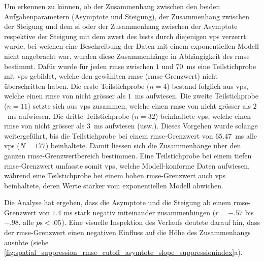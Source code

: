 \documentclass[11pt, twoside, a4paper]{book}		%
\begin{document}
Um erkennen zu können, ob der Zusammenhang zwischen den beiden Aufgabenparametern (Asymptote und Steigung), der Zusammenhang zwischen der Steigung und dem \gls{si} oder der Zusammenhang zwischen der Asymptote respektive der Steigung mit dem \gls{zwert} des \gls{bist}s durch diejenigen \glspl{vp} verzerrt wurde, bei welchen eine Beschreibung der Daten mit einem exponentiellen Modell nicht angebracht war, wurden diese Zusammenhänge in Abhängigkeit des \gls{rmse} bestimmt. 
Dafür wurde für jeden \gls{rmse}  zwischen $1$ und $70$~ms eine Teilstichprobe mit \glspl{vp} gebildet, welche den gewählten \gls{rmse} (\gls{rmse}-Grenzwert) nicht überschritten haben. Die erste Teilstichprobe ($n=4$) bestand folglich aus \glspl{vp}, welche einen \gls{rmse} von nicht grösser als $1$~ms aufwiesen. Die zweite Teilstichprobe ($n=11$) setzte sich aus \glspl{vp} zusammen, welche einen \gls{rmse} von nicht grösser als $2$~ms aufwiesen. Die dritte Teilstichprobe ($n=32$) beinhaltete \glspl{vp}, welche einen \gls{rmse} von nicht grösser als $3$~ms aufwiesen (usw.). Dieses Vorgehen wurde solange weitergeführt, bis die Teilstichprobe bei einem \gls{rmse}-Grenzwert von $65.47$~ms alle \glspl{vp} ($N=177$) beinhaltete. 
Damit liessen sich die Zusammenhänge über den ganzen \gls{rmse}-Grenz\-wert\-be\-reich bestimmen. Eine Teilstichprobe bei einem tiefen \gls{rmse}-Grenz\-wert umfasste somit \glspl{vp}, welche Modell-konforme Daten aufwiesen, während eine Teilstichprobe bei einem hohen \gls{rmse}-Grenzwert auch \glspl{vp} beinhaltete, deren Werte stärker vom exponentiellen Modell abwichen.

Die Analyse hat ergeben, dass die Asymptote und die Steigung ab einem \gls{rmse}-Grenzwert von $1.4$ ms stark negativ miteinander zusammenhingen ($r=-.57$ bis $-.98$, alle $p\textnormal{s}<.05$). Eine visuelle Inspektion des Verlaufs deutete darauf hin, dass der \gls{rmse}-Grenzwert einen negativen Einfluss auf die Höhe des Zusammenhangs ausübte (siehe \autoref{fig:spatial_suppression_rmse_cutoff_asymtote_slope_suppressionindex}a).
\end{document}
